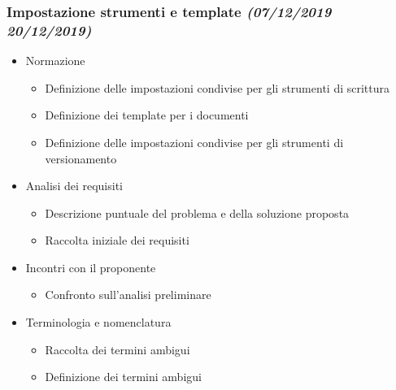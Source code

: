 \documentclass[../piano-di-progetto.tex]{subfiles}
\begin{document}
\subsubsection[Impostazione strumenti e template]{Impostazione strumenti e template {\normalsize\normalfont\itshape(07/12/2019  20/12/2019)}}%
\label{subs:impostazione_strumenti_e_template}
\begin{itemize}
  \item Normazione
  \begin{itemize}
    \item Definizione delle impostazioni condivise per gli strumenti di scrittura
    \item Definizione dei template per i documenti
    \item Definizione delle impostazioni condivise per gli strumenti di versionamento
  \end{itemize}
  \item Analisi dei requisiti
  \begin{itemize}
    \item Descrizione puntuale del problema e della soluzione proposta
    \item Raccolta iniziale dei requisiti
  \end{itemize}
  \item Incontri con il proponente
  \begin{itemize}
    \item Confronto sull'analisi preliminare
  \end{itemize}
  \item Terminologia e nomenclatura
  \begin{itemize}
    \item Raccolta dei termini ambigui
    \item Definizione dei termini ambigui
  \end{itemize}
\end{itemize}
\end{document}
